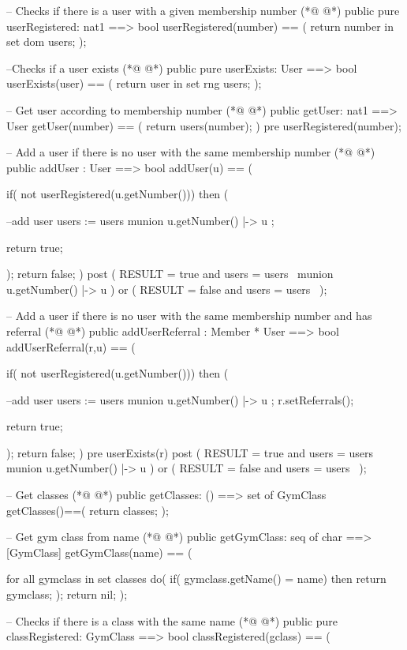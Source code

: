 \begin{vdmpp}[breaklines=true]
  -- Checks if there is a user with a given membership number
(*@
\label{userRegistered:74}
@*)
  public pure userRegistered: nat1 ==> bool
  userRegistered(number) == (
    return number in set dom users;
  );
  
  --Checks if a user exists
(*@
\label{userExists:80}
@*)
  public pure userExists: User ==> bool
  userExists(user) == (
    return user in set rng users;
  );
  
  -- Get user according to membership number
(*@
\label{getUser:86}
@*)
  public getUser: nat1 ==> User
  getUser(number) == (
   return users(number);
  )
  pre userRegistered(number);
  
  -- Add a user if there is no user with the same membership number
(*@
\label{addUser:93}
@*)
  public addUser : User ==> bool
  addUser(u) == (
   
   if( not userRegistered(u.getNumber())) then (
     
     --add user 
     users := users munion { u.getNumber() |-> u };
    
    return true;
   
   ); 
   return false;
  ) 
  post ( RESULT = true and users = users~ munion { u.getNumber() |-> u } ) or ( RESULT = false and users = users~ ); 
  
  -- Add a user if there is no user with the same membership number and has referral
(*@
\label{addUserReferral:109}
@*)
  public addUserReferral : Member * User ==> bool
  addUserReferral(r,u) == (
   
   if( not userRegistered(u.getNumber())) then (
     
     --add user 
     users := users munion { u.getNumber() |-> u };
     r.setReferrals();
    
    return true;
   
   ); 
   return false;
  ) 
 pre userExists(r)
  post ( RESULT = true and users = users~ munion { u.getNumber() |-> u } ) or ( RESULT = false and users = users~ ); 


 -- Get classes
(*@
\label{getClasses:128}
@*)
 public getClasses: () ==> set of GymClass
 getClasses()==(
  return classes;
 );
 
 -- Get gym class from name
(*@
\label{getGymClass:134}
@*)
  public getGymClass: seq of char ==> [GymClass]
  getGymClass(name) == (

  for all gymclass in set classes do(
   if( gymclass.getName() = name) then 
    return gymclass;
  );
  return nil;
  );
 
 -- Checks if there is a class with the same name
(*@
\label{classRegistered:145}
@*)
 public pure classRegistered: GymClass ==> bool
 classRegistered(gclass) == (
  

\end{vdmpp}
